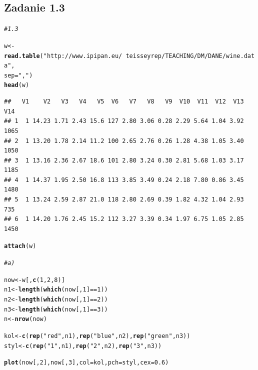 \documentclass[10pt,a4paper]{article}\usepackage[]{graphicx}\usepackage[]{color}
\makeatletter
\newcommand{\hlnum}[1]{\textcolor[rgb]{0.686,0.059,0.569}{#1}}%
\newcommand{\hlstr}[1]{\textcolor[rgb]{0.192,0.494,0.8}{#1}}%
\newcommand{\hlcom}[1]{\textcolor[rgb]{0.678,0.584,0.686}{\textit{#1}}}%
\newcommand{\hlopt}[1]{\textcolor[rgb]{0,0,0}{#1}}%
\newcommand{\hlstd}[1]{\textcolor[rgb]{0.345,0.345,0.345}{#1}}%
\newcommand{\hlkwb}[1]{\textcolor[rgb]{0.69,0.353,0.396}{#1}}%
\newcommand{\hlkwc}[1]{\textcolor[rgb]{0.333,0.667,0.333}{#1}}%
\newcommand{\hlkwd}[1]{\textcolor[rgb]{0.737,0.353,0.396}{\textbf{#1}}}%
\newenvironment{kframe}{%
 \def\at@end@of@kframe{}%
 \ifinner\ifhmode%
  \def\at@end@of@kframe{\end{minipage}}%
  \begin{minipage}{\columnwidth}%
 \fi\fi%
 \def\FrameCommand##1{\hskip\@totalleftmargin \hskip-\fboxsep
 \colorbox{shadecolor}{##1}\hskip-\fboxsep
     \hskip-\linewidth \hskip-\@totalleftmargin \hskip\columnwidth}%
 \MakeFramed {\advance\hsize-\width
   \@totalleftmargin\z@ \linewidth\hsize
   \@setminipage}}%
 {\par\unskip\endMakeFramed%
 \at@end@of@kframe}
\newenvironment{knitrout}{}{} %
\makeatother
\begin{document}
\subsection*{Zadanie 1.3}

\begin{knitrout}
\color{fgcolor}\begin{kframe}
\begin{alltt}
\hlcom{# 1.3}

\hlstd{w} \hlkwb{<-} \hlkwd{read.table}\hlstd{(}\hlstr{"http://www.ipipan.eu/~teisseyrep/TEACHING/DM/DANE/wine.data"}\hlstd{,}
    \hlkwc{sep} \hlstd{=} \hlstr{","}\hlstd{)}
\hlkwd{head}\hlstd{(w)}
\end{alltt}
\begin{verbatim}
##   V1    V2   V3   V4   V5  V6   V7   V8   V9  V10  V11  V12  V13  V14
## 1  1 14.23 1.71 2.43 15.6 127 2.80 3.06 0.28 2.29 5.64 1.04 3.92 1065
## 2  1 13.20 1.78 2.14 11.2 100 2.65 2.76 0.26 1.28 4.38 1.05 3.40 1050
## 3  1 13.16 2.36 2.67 18.6 101 2.80 3.24 0.30 2.81 5.68 1.03 3.17 1185
## 4  1 14.37 1.95 2.50 16.8 113 3.85 3.49 0.24 2.18 7.80 0.86 3.45 1480
## 5  1 13.24 2.59 2.87 21.0 118 2.80 2.69 0.39 1.82 4.32 1.04 2.93  735
## 6  1 14.20 1.76 2.45 15.2 112 3.27 3.39 0.34 1.97 6.75 1.05 2.85 1450
\end{verbatim}
\begin{alltt}
\hlkwd{attach}\hlstd{(w)}

\hlcom{# a)}

\hlstd{now} \hlkwb{<-} \hlstd{w[,} \hlkwd{c}\hlstd{(}\hlnum{1}\hlstd{,} \hlnum{2}\hlstd{,} \hlnum{8}\hlstd{)]}
\hlstd{n1} \hlkwb{<-} \hlkwd{length}\hlstd{(}\hlkwd{which}\hlstd{(now[,} \hlnum{1}\hlstd{]} \hlopt{==} \hlnum{1}\hlstd{))}
\hlstd{n2} \hlkwb{<-} \hlkwd{length}\hlstd{(}\hlkwd{which}\hlstd{(now[,} \hlnum{1}\hlstd{]} \hlopt{==} \hlnum{2}\hlstd{))}
\hlstd{n3} \hlkwb{<-} \hlkwd{length}\hlstd{(}\hlkwd{which}\hlstd{(now[,} \hlnum{1}\hlstd{]} \hlopt{==} \hlnum{3}\hlstd{))}
\hlstd{n} \hlkwb{<-} \hlkwd{nrow}\hlstd{(now)}

\hlstd{kol} \hlkwb{<-} \hlkwd{c}\hlstd{(}\hlkwd{rep}\hlstd{(}\hlstr{"red"}\hlstd{, n1),} \hlkwd{rep}\hlstd{(}\hlstr{"blue"}\hlstd{, n2),} \hlkwd{rep}\hlstd{(}\hlstr{"green"}\hlstd{, n3))}
\hlstd{styl} \hlkwb{<-} \hlkwd{c}\hlstd{(}\hlkwd{rep}\hlstd{(}\hlstr{"1"}\hlstd{, n1),} \hlkwd{rep}\hlstd{(}\hlstr{"2"}\hlstd{, n2),} \hlkwd{rep}\hlstd{(}\hlstr{"3"}\hlstd{, n3))}

\hlkwd{plot}\hlstd{(now[,} \hlnum{2}\hlstd{], now[,} \hlnum{3}\hlstd{],} \hlkwc{col} \hlstd{= kol,} \hlkwc{pch} \hlstd{= styl,} \hlkwc{cex} \hlstd{=} \hlnum{0.6}\hlstd{)}
\end{alltt}
\end{kframe}


\end{knitrout}
\end{document}

